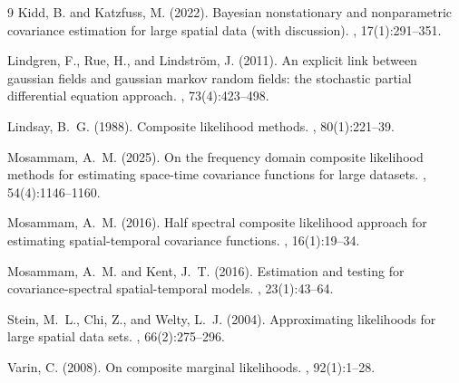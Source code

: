 \documentclass[twoside]{article}
\renewcommand{\/}[1]{\mathbf{\boldsymbol{#1}}}
\begin{document}
\begin{thebibliography}{9}
Kidd, B. and Katzfuss, M. (2022).
\newblock Bayesian nonstationary and nonparametric covariance estimation for
  large spatial data (with discussion).
, 17(1):291--351.


Lindgren, F., Rue, H., and Lindstr{\"o}m, J. (2011).
\newblock An explicit link between gaussian fields and gaussian markov random
  fields: the stochastic partial differential equation approach.
, 73(4):423--498.


Lindsay, B.~G. (1988).
\newblock Composite likelihood methods.
, 80(1):221--39.

Mosammam, A.~M. (2025).
\newblock On the frequency domain composite likelihood methods for estimating
  space-time covariance functions for large datasets.
,
  54(4):1146--1160.


Mosammam, A.~M. (2016).
\newblock Half spectral composite likelihood approach for estimating
  spatial-temporal covariance functions.
, 16(1):19--34.

Mosammam, A.~M. and Kent, J.~T. (2016).
\newblock Estimation and testing for covariance-spectral spatial-temporal
  models.
, 23(1):43--64.


Stein, M.~L., Chi, Z., and Welty, L.~J. (2004).
\newblock Approximating likelihoods for large spatial data sets.
, 66(2):275--296.

Varin, C. (2008).
\newblock On composite marginal likelihoods.
, 92(1):1--28.




\end{thebibliography}
 
\end{document}
